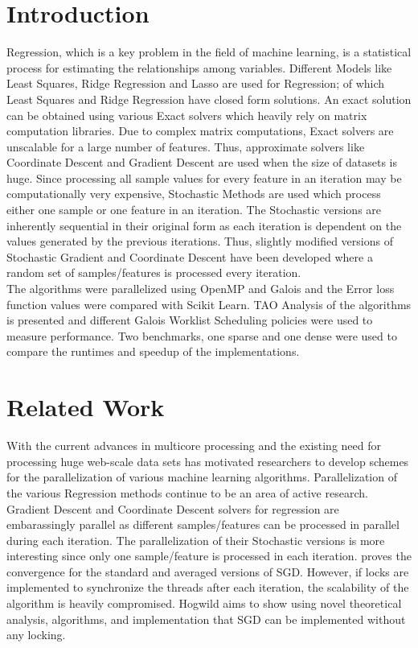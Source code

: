 \documentclass{sigplanconf}
\begin{document}
\section{Introduction}
Regression, which is a key problem in the field of machine learning, is a statistical process for estimating the relationships among variables. 
Different Models like Least Squares, Ridge Regression and Lasso are used for Regression; of which Least Squares and Ridge Regression have
closed form solutions. An exact solution can be obtained using various Exact solvers which heavily rely on matrix computation libraries. 
Due to complex matrix computations, Exact solvers are unscalable for a large number of features. Thus, approximate solvers like Coordinate Descent 
and Gradient Descent are used when the size of datasets is huge. Since processing all sample values for every feature in an iteration may be computationally
very expensive, Stochastic Methods are used which process either one sample or one feature in an iteration. The Stochastic versions are inherently
sequential in their original form as each iteration is dependent on the values generated by the previous iterations. Thus, slightly modified
versions of Stochastic Gradient and Coordinate Descent have been developed where a random set of samples/features is processed every iteration.\\

The algorithms were parallelized using OpenMP and Galois and the Error loss function values were compared with Scikit Learn. TAO Analysis
of the algorithms is presented and different Galois Worklist Scheduling policies were used to measure performance. Two benchmarks, one sparse and one 
dense were used to compare the runtimes and speedup of the implementations.

\section{Related Work}
With the current advances in multicore processing and the existing need for processing huge web-scale data sets has motivated 
researchers to develop schemes for the parallelization of various machine learning algorithms. Parallelization of the various Regression 
methods continue to be an area of active research. Gradient Descent and Coordinate Descent solvers for regression are embarassingly parallel 
as different samples/features can be processed in parallel during each iteration. The parallelization of their Stochastic versions is more
interesting since only one sample/feature is processed in each iteration. \cite{zhang1} proves the convergence for the standard and averaged 
versions of SGD. However, if locks are implemented to synchronize the threads after each iteration, the scalability of the algorithm is heavily
compromised. Hogwild \cite{hogwild} aims to show using novel theoretical analysis, algorithms, and implementation that SGD can be implemented
without any locking. \\
\end{document}
